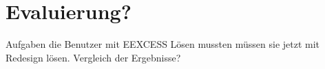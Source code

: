 \section{Evaluierung?}
Aufgaben die Benutzer mit EEXCESS Lösen mussten müssen sie jetzt mit Redesign lösen. Vergleich der Ergebnisse?